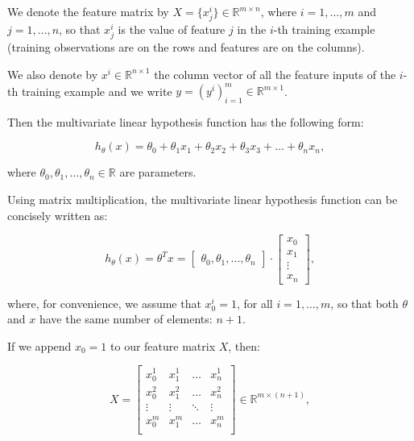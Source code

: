 \documentclass[a4paper,11pt]{report}
\begin{document}
We denote the feature matrix by $X = \{x_j^i\}\in\mathbb{R}^{m\times n}$, where $i=1,\ldots, m$ and $j=1,\ldots, n$, so that $x_j^i$ is the value of feature $j$ in the $i$-th training example
(training observations are on the rows and features are on the columns).

We also denote by $x^{i}\in\mathbb{R}^{n\times 1}$ the column vector of all the feature inputs of the $i$-th training example and we write $y = (y^i)_{i=1}^{m}\in\mathbb{R}^{m\times 1}$.

Then the multivariate linear hypothesis function has the following form:

\begin{equation}\label{eq:mul-reg-hyp}
h_\theta (x) = \theta_0 + \theta_1 x_1 + \theta_2 x_2 + \theta_3 x_3 + \ldots + \theta_n x_n,
\end{equation}

where $\theta_0, \theta_1, \ldots, \theta_n \in \mathbb{R}$ are parameters.

Using matrix multiplication, the multivariate linear hypothesis function can be concisely written as:

\begin{equation}\label{eq:mul-reg-hyp-vec}
h_\theta(x) = \theta^T x = \begin{bmatrix}\theta_0, \theta_1,\ldots, \theta_n \end{bmatrix} \cdot \begin{bmatrix}x_0 \\ x_1 \\ \vdots \\ x_n \end{bmatrix},
\end{equation}

where, for convenience, we assume that $x^i_0 = 1$, for all $i= 1, \ldots, m$, so that both $\theta$ and $x$ have the same number of elements: $n+1$.

If we append $x_0 = 1$ to our feature matrix $X$, then:

\begin{equation*}
X = \begin{bmatrix}
x^{1}_0 & x^{1}_1 & \ldots & x^{1}_n  \\
x^{2}_0 & x^{2}_1 & \ldots & x^{2}_n  \\
\vdots  & \vdots  & \ddots & \vdots \\
x^{m}_0 & x^{m}_1 & \ldots & x^{m}_n  \\
\end{bmatrix}\in\mathbb{R}^{m \times (n+1)},
\end{equation*}
\end{document}
